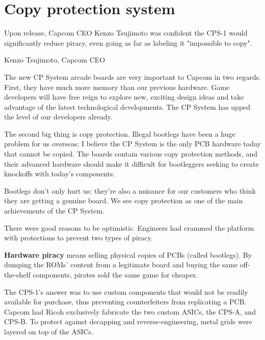

\section{Copy protection system}

Upon release, Capcom CEO Kenzo Tsujimoto was confident the CPS-1 would significantly reduce piracy, even going as far as labeling it "impossible to copy".

\begin{q}{Kenzo Tsujimoto, Capcom CEO\cite{gamest38}}
    
The new CP System arcade boards are very important to Capcom in two regards. First, they have much more memory than our previous hardware. Game developers will have free reign to explore new, exciting design ideas and take advantage of the latest technological developments. The CP System has upped the level of our developers already.

The second big thing is copy protection. Illegal bootlegs have been a huge problem for us overseas; I believe the CP System is the only PCB hardware today that cannot be copied. The boards contain various copy protection methods, and their advanced hardware should make it difficult for bootleggers seeking to create knockoffs with today's components. 

Bootlegs don't only hurt us; they're also a nuisance for our customers who think they are getting a genuine board. We see copy protection as one of the main achievements of the CP System.
\end{q}


There were good reasons to be optimistic. Engineers had crammed the platform with protections to prevent two types of piracy.


\textbf{Hardware piracy} means selling physical copies of PCBs (called bootlegs). By dumping the ROMs' content from a legitimate board and buying the same off-the-shelf components, pirates sold the same game for cheaper.

The CPS-1's answer was to use custom components that would not be readily available for purchase, thus preventing counterfeiters from replicating a PCB. Capcom had Ricoh exclusively fabricate the two custom ASICs, the CPS-A, and CPS-B. To protect against decapping and reverse-engineering, metal grids were layered on top of the ASICs\cite{arcadeHackerCPS1Rev}. 



